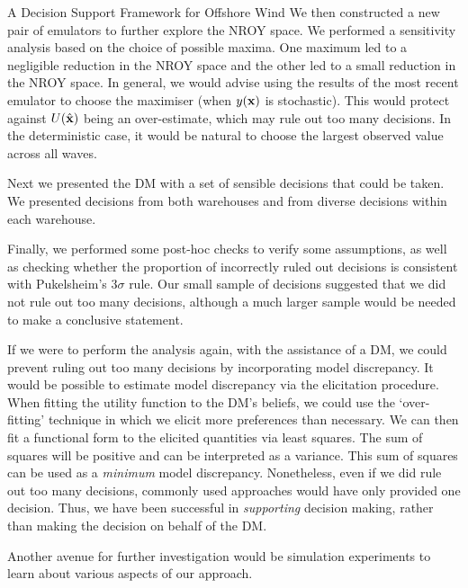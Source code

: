 \begin{chapter}{A Decision Support Framework for Offshore Wind \label{Ch:ds-for-ow}}
We then constructed a new pair of emulators to further explore the NROY space. We performed a sensitivity analysis based on the choice of possible maxima. One maximum led to a negligible reduction in the NROY space and the other led to a small reduction in the NROY space. In general, we would advise using the results of the most recent emulator to choose the maximiser (when $y(\mathbf{x})$ is stochastic). This would protect against $U(\hat{\mathbf{x}})$ being an over-estimate, which may rule out too many decisions. In the deterministic case, it would be natural to choose the largest observed value across all waves.

Next we presented the DM with a set of sensible decisions that could be taken. We presented decisions from both warehouses and from diverse decisions within each warehouse.

Finally, we performed some post-hoc checks to verify some assumptions, as well as checking whether the proportion of incorrectly ruled out decisions is consistent with Pukelsheim's $3\sigma$ rule. Our small sample of decisions suggested that we did not rule out too many decisions, although a much larger sample would be needed to make a conclusive statement.

If we were to perform the analysis again, with the assistance of a DM, we could prevent ruling out too many decisions by incorporating model discrepancy. It would be possible to estimate model discrepancy via the elicitation procedure. When fitting the utility function to the DM's beliefs, we could use the `over-fitting' technique in which we elicit more preferences than necessary. We can then fit a functional form to the elicited quantities via least squares. The sum of squares will be positive and can be interpreted as a variance. This sum of squares can be used as a \textit{minimum} model discrepancy. Nonetheless, even if we did rule out too many decisions, commonly used approaches would have only provided one decision. Thus, we have been successful in \textit{supporting} decision making, rather than making the decision on behalf of the DM.

Another avenue for further investigation would be simulation experiments to learn about various aspects of our approach. 


\end{chapter}
